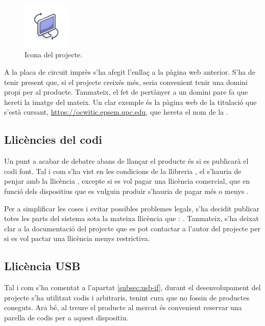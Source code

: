 \begin{figure}[ht]
    \centering
    \includegraphics[width=0.2\textwidth]{images/gyroscreen.png}
    \caption{Icona del projecte.}
    \label{fig:icon}
\end{figure}

A la placa de circuit imprès s'ha afegit l'enllaç a la pàgina web anterior.
S'ha de tenir present que, si el projecte creixés més, seria convenient tenir
una domini propi per al producte. Tanmateix, el fet de pertànyer a un domini
pare fa que hereti la imatge del mateix. Un clar exemple és la pàgina web de
la titulació que s'està cursant, \url{https://ocwitic.epsem.upc.edu}, que
hereta el nom de la .

\subsection{Llicències del codi}

Un punt a acabar de debatre abans de llançar el producte és si es publicarà el
codi font. Tal i com s'ha vist en les condicions de la llibreria , el
 s'hauria de penjar amb la llicència , excepte si es
vol pagar una llicència comercial, que en funció dels dispositius que es vulguin
produir s'hauria de pagar més o menys \cite{VusbLicensing}.

Per a simplificar les coses i evitar possibles problemes legals, s'ha decidit
publicar totes les parts del sistema sota la mateixa llicència que :
. Tanmateix, s'ha deixat clar a la documentació del projecte que
es pot contactar a l'autor del projecte per si es vol pactar una llicència menys
restrictiva.

\subsection{Llicència USB}

Tal i com s'ha comentat a l'apartat \ref{subsec:usb-if}, durant el desenvolupament
del projecte s'ha utilitzat codis  i  arbitraris, tenint
cura que no fossin de productes coneguts. Ara bé, al treure el producte al
mercat és convenient reservar una parella de codis per a aquest dispositiu.

